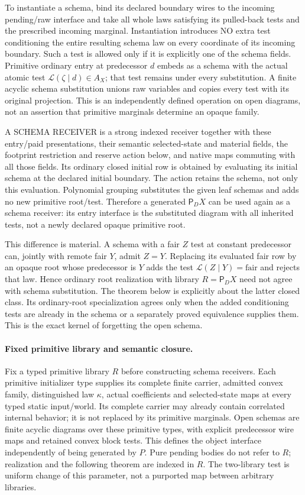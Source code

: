 \documentclass[11pt]{article}
\begin{document}
To instantiate a schema, bind its declared boundary wires to the incoming pending/raw interface and take all whole laws satisfying its pulled-back tests and the prescribed incoming marginal. Instantiation introduces NO extra test conditioning the entire resulting schema law on every coordinate of its incoming boundary. Such a test is allowed only if it is explicitly one of the schema fields. Primitive ordinary entry at predecessor $d$ embeds as a schema with the actual atomic test $\mathcal L(\zeta\mid d)\in A_X$; that test remains under every substitution. A finite acyclic schema substitution unions raw variables and copies every test with its original projection. This is an independently defined operation on open diagrams, not an assertion that primitive marginals determine an opaque family.

A SCHEMA RECEIVER is a strong indexed receiver together with these entry/paid presentations, their semantic selected-state and material fields, the footprint restriction and reserve action below, and native maps commuting with all those fields. Its ordinary closed initial row is obtained by evaluating its initial schema at the declared initial boundary. The action retains the schema, not only this evaluation. Polynomial grouping substitutes the given leaf schemas and adds no new primitive root/test. Therefore a generated $\mathsf P_DX$ can be used again as a schema receiver: its entry interface is the substituted diagram with all inherited tests, not a newly declared opaque primitive root.

This difference is material. A schema with a fair $Z$ test at constant predecessor can, jointly with remote fair $Y$, admit $Z=Y$. Replacing its evaluated fair row by an opaque root whose predecessor is $Y$ adds the test $\mathcal L(Z\mid Y)=\mathrm{fair}$ and rejects that law. Hence ordinary root realization with library $R=\mathsf P_DX$ need not agree with schema substitution. The theorem below is explicitly about the latter closed class. Its ordinary-root specialization agrees only when the added conditioning tests are already in the schema or a separately proved equivalence supplies them. This is the exact kernel of forgetting the open schema.

\paragraph{Fixed primitive library and semantic closure.}
Fix a typed primitive library $R$ before constructing schema receivers. Each primitive initializer type supplies its complete finite carrier, admitted convex family, distinguished law $\kappa$, actual coefficients and selected-state maps at every typed static input/world. Its complete carrier may already contain correlated internal behavior; it is not replaced by its primitive marginals. Open schemas are finite acyclic diagrams over these primitive types, with explicit predecessor wire maps and retained convex block tests. This defines the object interface independently of being generated by $P$. Pure pending bodies do not refer to $R$; realization and the following theorem are indexed in $R$. The two-library test is uniform change of this parameter, not a purported map between arbitrary libraries.
\end{document}

